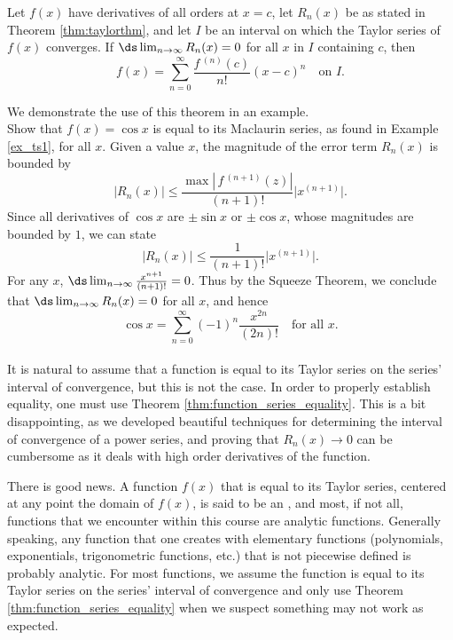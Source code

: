 {Let $f(x)$ have derivatives of all orders at $x=c$, let $R_n(x)$ be as stated in Theorem \ref{thm:taylorthm}, and let $I$ be an interval on which the Taylor series of $f(x)$ converges. 
If $\ds\lim_{n\to\infty} R_n(x) = 0$ for all $x$ in $I$ containing $c$, then 
$$f(x) = \sum_{n=0}^\infty \frac{f\,^{(n)}(c)}{n!}(x-c)^n\quad \text{on $I$.}$$
}

We demonstrate the use of this theorem in an example.\\

{Show that $f(x) = \cos x$ is equal to its Maclaurin series, as found in Example \ref{ex_ts1}, for all $x$. 
}
{Given a value $x$, the magnitude of the error term $R_n(x)$ is bounded by
$$ \big|R_n(x)\big| \leq \frac{\max\left|\,f\,^{(n+1)}(z)\right|}{(n+1)!}\big|x^{(n+1)}\big|.$$
Since all derivatives of $\cos x$ are $\pm \sin x$ or $\pm\cos x$, whose magnitudes are bounded by $1$, we can state
$$ \big|R_n(x)\big| \leq \frac{1}{(n+1)!}\big|x^{(n+1)}\big|.$$
For any $x$, $\ds\lim_{n\to\infty} \frac{x^{n+1}}{(n+1)!} = 0$. Thus by the Squeeze Theorem, we conclude that $\ds \lim_{n\to\infty} R_n(x) = 0$ for all $x$, and hence
$$\cos x = \sum_{n=0}^\infty (-1)^{n}\frac{x^{2n}}{(2n)!}\quad \text{for all $x$}.$$
\baselineskip
}\\

It is natural to assume that a function is  equal to its Taylor series on the series' interval of convergence, but this is not the case. In order to properly establish equality, one must use Theorem \ref{thm:function_series_equality}. This is a bit disappointing, as we developed beautiful techniques for determining the interval of convergence of a power series, and proving that $R_n(x)\to 0$ can be cumbersome as it deals with high order derivatives of the function.

There is good news. A function $f(x)$ that is equal to its Taylor series, centered at any point the domain of $f(x)$, is said to be an , and most, if not all, functions that we encounter within this course are analytic functions. Generally speaking, any function that one creates with elementary functions (polynomials, exponentials, trigonometric functions, etc.) that is not piecewise defined is probably analytic. For most functions, we assume the function is equal to its Taylor series on the series' interval of convergence and only use Theorem \ref{thm:function_series_equality} when we suspect something may not work as expected.


